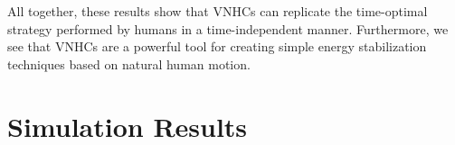 All together, these results show that VNHCs can replicate the time-optimal
strategy performed by humans in a time-independent manner. Furthermore, we see
that VNHCs are a powerful tool for creating simple energy stabilization
techniques based on natural human motion.

\section{Simulation Results}

